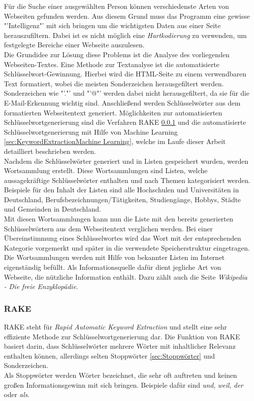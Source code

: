 	Für die Suche einer ausgewählten Person können verschiedenste Arten von Webseiten gefunden werden. Aus diesem Grund muss das Programm eine gewisse "'Intelligenz"' mit sich bringen um die wichtigsten Daten aus einer Seite herauszufiltern. Dabei ist es nicht möglich eine \textit{Hartkodierung} zu verwenden, um festgelegte Bereiche einer Webseite auszulesen.\\
	Die Grundidee zur Lösung diese Problems ist die Analyse des vorliegenden Webseiten-Textes. Eine Methode zur Textanalyse ist die automatisierte Schlüsselwort-Gewinnung. Hierbei wird die HTML-Seite zu einem verwendbaren Text formatiert, wobei die meisten Sonderzeichen herausgefiltert werden. Sonderzeichen wie "'."' und "'@"' werden dabei nicht herausgefiltert, da sie für die E-Mail-Erkennung wichtig sind. Anschließend werden Schlüsselwörter aus dem formatierten Webseitentext generiert. Möglichkeiten zur automatisierten Schlüsselwortgenerierung sind die Verfahren RAKE \ref{sec:RAKE} und die automatisierte Schlüsselwortgenerierung mit Hilfe von Machine Learning \ref{sec:KeywordExtractionMachine Learning}, welche im Laufe dieser Arbeit detailliert beschrieben werden.\\
	Nachdem die Schlüsselwörter generiert und in Listen gespeichert wurden, werden Wortsammlung erstellt. Diese Wortsammlungen sind Listen, welche aussagekräftige Schlüsselwörter enthalten und nach Themen kategorisiert werden. Beispiele für den Inhalt der Listen sind alle Hochschulen und Universitäten in Deutschland, Berufsbezeichnungen/Tätigkeiten, Studiengänge, Hobbys, Städte und Gemeinden in Deutschland.\\
	Mit diesen Wortsammlungen kann nun die Liste mit den bereits generierten Schlüsselwörtern aus dem Webseitentext verglichen werden. Bei einer Übereinstimmung eines Schlüsselwortes wird das Wort mit der entsprechenden Kategorie vorgemerkt und später in die verwendete Speicherstruktur eingetragen. \\
	Die Wortsammlungen werden mit Hilfe von bekannter Listen im Internet eigenständig befüllt. Als Informationsquelle dafür dient jegliche Art von Webseite, die nützliche Information enthält. Dazu zählt auch die Seite \textit{Wikipedia - Die freie Enzyklopädie}.	
		\subsubsection{RAKE}
		\label{sec:RAKE}
		RAKE steht für \textit{Rapid Automatic Keyword Extraction} und stellt eine sehr effiziente Methode zur Schlüsselwortgenerierung dar. Die Funktion von RAKE basiert darin, dass Schlüsselwörter mehrere Wörter mit inhaltlicher Relevanz enthalten können, allerdings selten Stoppwörter \ref{sec:Stoppwörter} und  Sonderzeichen.\cite{rose2010automatic}\\
		Als Stoppwörter werden Wörter bezeichnet, die sehr oft auftreten und keinen großen Informationsgewinn mit sich bringen. Beispiele dafür sind \textit{und}, \textit{weil}, \textit{der} oder \textit{als}.\cite{Stopwords}\\
		
